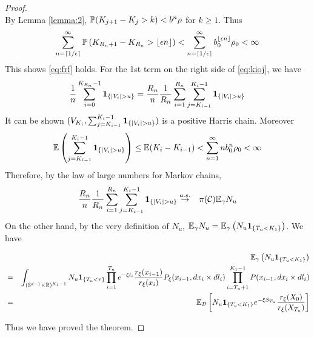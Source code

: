 \begin{proof}
\[  \]
  By Lemma \ref{lemma:2}, $\P(K_{j + 1} - K_j > k) < b^n \rho$ for $k \geq 1$.
  Thus
  \[
    \sum_{n=\ceil{1/\epsilon}}^\infty \P\left(
    {K_{R_n + 1} - K_{R_n}} > \floor{\epsilon n}
  \right)
  <
  \sum_{n=\ceil{1/\epsilon}}^\infty b_0^{\floor{\epsilon n}} \rho_0 < \infty
  \]
  This shows \eqref{eq:frf} holds.
  For the 1st term on the right side of \eqref{eq:kioj}, we have
  \[
  {1 \over n} \sum_{i=0}^{K_{R_n}-1} \1{|V_i| > u}
    =
    {R_n \over n} {1 \over R_n} \sum_{i=1}^{R_n}
    \sum_{j=K_{i-1}}^{K_i-1}\1{|V_i| > u}
  \]
  It can be shown $(V_{K_i}, \sum_{j=K_{i-1}}^{K_i-1}\1{|V_i| > u})$
  is a positive Harris chain. Moreover
  \[
  \E \left(
    \sum_{j=K_{i-1}}^{K_i-1}\1{|V_i| > u}
  \right)
  \leq
  \E (K_i - K_{i-1}) < \sum_{n=1}^\infty n b_0^n \rho_0 < \infty
  \]
  Therefore, by the law of large numbers for Markov chains,
  \begin{eqnarray*}
    {R_n \over n} {1 \over R_n} \sum_{i=1}^{R_n}
    \sum_{j=K_{i-1}}^{K_i-1}\1{|V_i| > u}
    &\overset{a.s.}{\to}& \pi(\mathcal C) \E_\gamma N_u
  \end{eqnarray*}
  On the other hand, by the very definition of $N_u$,
  $\E_\gamma N_u = \E_\gamma \left( N_u \1{T_u < K_1}\right)$. We have
  \begin{small}
    \begin{eqnarray*}
      && \E_\gamma \left( N_u \1{T_u < K_1}\right) \\
      &=&
      \int_{(\sphere^{d-1} \times \reals)^{K_1 - 1}}
      N_u \1{T_u < \tau}
      \prod_{i=1}^{T_u} e^{-\xi l_i}
      {r_\xi(x_{i-1}) \over r_\xi(x_{i})}P_\xi(x_{i-1}, dx_i \times dl_i)
      \prod_{i=T_u+1}^{K_1 - 1} P(x_{i-1}, dx_i \times d l_i) \\
      &=&
      \E_{\mathcal D}
      \left[
        N_u \1{T_u < K_1} e^{-\xi S_{T_u}}
        {r_\xi(X_0)
          \over
          r_\xi(X_{T_u})
        }
      \right]
    \end{eqnarray*}
  \end{small}
  Thus we have proved the theorem.
\end{proof}

